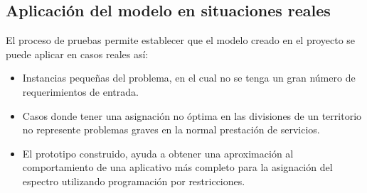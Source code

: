 \subsection{Aplicación del modelo en situaciones reales}

El proceso de pruebas permite establecer que el modelo creado en el proyecto se puede aplicar en casos reales así:

\begin{itemize}
	\item Instancias pequeñas del problema, en el cual no se tenga un gran número de requerimientos de entrada.
	\item Casos donde tener una asignación no óptima en las divisiones de un territorio no represente problemas graves en la normal prestación de servicios.
	\item El prototipo construido, ayuda a obtener una aproximación al comportamiento de una aplicativo más completo para la asignación del espectro utilizando programación por restricciones.
\end{itemize}

